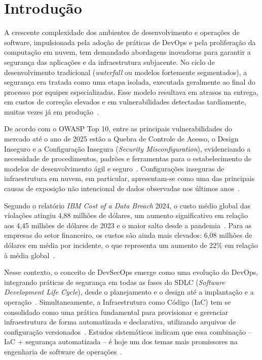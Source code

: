 \chapter{Introdução}
\label{cap:introducao-marker}

A crescente complexidade dos ambientes de desenvolvimento e operações de software, impulsionada pela adoção de práticas de DevOps e pela proliferação da computação em nuvem, tem demandado abordagens inovadoras para garantir a segurança das aplicações e da infraestrutura subjacente. No ciclo de desenvolvimento tradicional (\textit{waterfall} ou modelos fortemente segmentados), a segurança era tratada como uma etapa isolada, executada geralmente ao final do processo por equipes especializadas. Esse modelo resultava em atrasos na entrega, em custos de correção elevados e em vulnerabilidades detectadas tardiamente, muitas vezes já em produção~.

De acordo com o OWASP Top 10, entre as principais vulnerabilidades do mercado até o ano de 2025 estão a Quebra de Controle de Acesso, o Design Inseguro e a Configuração Insegura (\textit{Security Misconfiguration}), evidenciando a necessidade de procedimentos, padrões e ferramentas para o estabelecimento de modelos de desenvolvimento ágil e seguro~. Configurações inseguras de infraestrutura em nuvem, em particular, apresentam-se como uma das principais causas de exposição não intencional de dados observadas nos últimos anos~.

Segundo o relatório \textit{IBM Cost of a Data Breach} 2024, o custo médio global das violações atingiu 4,88 milhões de dólares, um aumento significativo em relação aos 4,45 milhões de dólares de 2023 e o maior salto desde a pandemia~. Para as empresas do setor financeiro, os custos são ainda mais elevados: 6,08 milhões de dólares em média por incidente, o que representa um aumento de 22\% em relação à média global~.

Nesse contexto, o conceito de DevSecOps emerge como uma evolução do DevOps, integrando práticas de segurança em todas as fases do SDLC (\textit{Software Development Life Cycle}), desde o planejamento e o design até a implantação e a operação~. Simultaneamente, a Infraestrutura como Código (IaC) tem se consolidado como uma prática fundamental para provisionar e gerenciar infraestrutura de forma automatizada e declarativa, utilizando arquivos de configuração versionados~. Estudos sistemáticos indicam que essa combinação -- IaC + segurança automatizada -- é hoje um dos temas mais promissores na engenharia de software de operações~.

